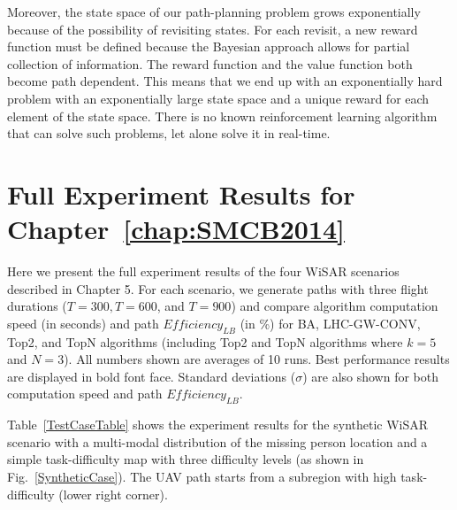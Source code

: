 Moreover, the state space of our path-planning problem grows exponentially because of the possibility of revisiting states. For each revisit, a new reward function must be defined because the Bayesian approach allows for partial collection of information. The reward function and the value function both become path dependent. This means that we end up with an exponentially hard problem with an exponentially large state space and a unique reward for each element of the state space. There is no known reinforcement learning algorithm that can solve such problems, let alone solve it in real-time.


\chapter{Full Experiment Results for Chapter~\ref{chap:SMCB2014}}
\label{chap:result}

Here we present the full experiment results of the four WiSAR scenarios described in Chapter 5. For each scenario, we generate paths with three flight durations ($T=300, T=600$, and $T=900$) and compare algorithm computation speed (in seconds) and path $\mathit{Efficiency_{LB}}$ (in \%) for BA, LHC-GW-CONV, Top2, and TopN algorithms (including Top2 and TopN algorithms where $k=5$ and $N=3$). All numbers shown are averages of 10 runs. Best performance results are displayed in bold font face. Standard deviations ($\sigma$) are also shown for both computation speed and path $\mathit{Efficiency_{LB}}$.


Table~\ref{TestCaseTable} shows the experiment results for the synthetic WiSAR scenario with a multi-modal distribution of the missing person location and a simple task-difficulty map with three difficulty levels (as shown in Fig.~\ref{SyntheticCase}). The UAV path starts from a subregion with high task-difficulty (lower right corner).

